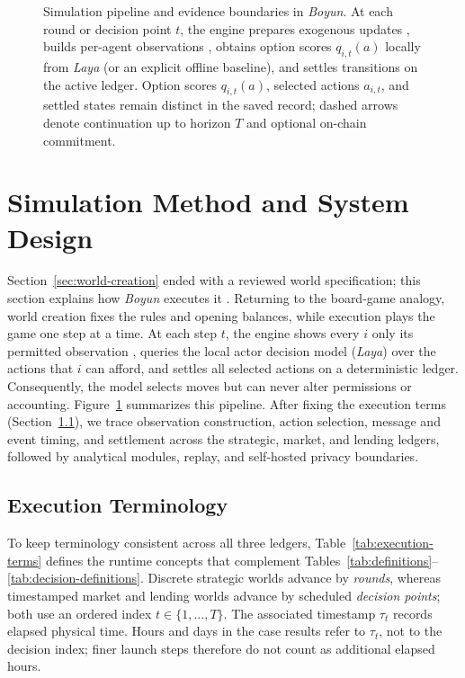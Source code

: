 \begin{figure}[!t]
\caption{Simulation pipeline and evidence boundaries in \textit{Boyun}.
At each round or decision point $t$, the engine prepares exogenous updates ,
builds per-agent observations , obtains option scores $q_{i,t}(a)$ locally from
\textit{Laya} (or an explicit offline baseline), and settles transitions on the
active ledger. Option scores $q_{i,t}(a)$, selected actions $a_{i,t}$, and
settled states remain distinct in the saved record; dashed arrows denote
continuation up to horizon $T$ and optional on-chain commitment.}
\label{fig:execution-pipeline}
\end{figure}

\section{Simulation Method and System Design}\label{sec:method-system}
Section~\ref{sec:world-creation} ended with a reviewed world specification;
this section explains how \textit{Boyun} executes it . Returning to the
board-game analogy, world creation fixes the rules and opening balances, while
execution plays the game one step at a time. At each step $t$, the engine
shows every  $i$  only its permitted observation , queries the local
actor decision model (\textit{Laya}) over the actions that  $i$
can afford, and settles all selected actions on a deterministic ledger.
Consequently, the model selects moves  but can never alter permissions or
accounting. Figure~\ref{fig:execution-pipeline} summarizes this pipeline. After
fixing the execution terms (Section~\ref{sec:exec-terms}), we trace  observation
construction, action selection,  message and event timing, and settlement across
the strategic, market, and lending ledgers, followed by analytical
modules, replay, and self-hosted privacy boundaries.

\subsection{Execution Terminology}\label{sec:exec-terms}
To keep terminology consistent across all three ledgers,
Table~\ref{tab:execution-terms} defines the runtime concepts that complement
Tables~\ref{tab:definitions}--\ref{tab:decision-definitions}. Discrete
strategic worlds advance by \textit{rounds}, whereas timestamped market and
lending worlds advance by scheduled \textit{decision points}; both use an ordered index $t \in \{1,\dots,T\}$. The associated timestamp
$\tau_t$ records elapsed physical time. Hours and days in the case results
refer to $\tau_t$, not to the decision index; finer launch steps therefore do
not count as additional elapsed hours.

